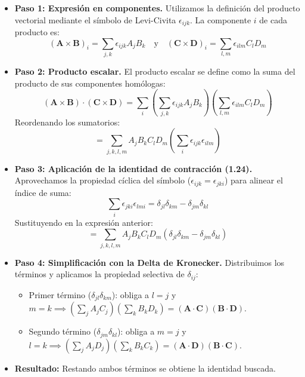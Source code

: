 \documentclass[a4paper]{article}
\begin{document}
\begin{itemize}
    \item \textbf{Paso 1: Expresión en componentes.}
    Utilizamos la definición del producto vectorial mediante el símbolo de Levi-Civita $\epsilon_{ijk}$. La componente $i$ de cada producto es:
    \begin{equation}
        (\mathbf{A} \times \mathbf{B})_i = \sum_{j,k} \epsilon_{ijk} A_j B_k \quad \text{y} \quad (\mathbf{C} \times \mathbf{D})_i = \sum_{l,m} \epsilon_{ilm} C_l D_m
    \end{equation}
    
    \item \textbf{Paso 2: Producto escalar.}
    El producto escalar se define como la suma del producto de sus componentes homólogas:
    \begin{equation}
        (\mathbf{A} \times \mathbf{B}) \cdot (\mathbf{C} \times \mathbf{D}) = \sum_i \left( \sum_{j,k} \epsilon_{ijk} A_j B_k \right) \left( \sum_{l,m} \epsilon_{ilm} C_l D_m \right)
    \end{equation}
    Reordenando los sumatorios:
    \begin{equation}
        = \sum_{j,k,l,m} A_j B_k C_l D_m \left( \sum_i \epsilon_{ijk} \epsilon_{ilm} \right)
    \end{equation}

    \item \textbf{Paso 3: Aplicación de la identidad de contracción (1.24).}
    Aprovechamos la propiedad cíclica del símbolo ($\epsilon_{ijk} = \epsilon_{jki}$) para alinear el índice de suma:
    \begin{equation}
        \sum_i \epsilon_{jki} \epsilon_{lmi} = \delta_{jl}\delta_{km} - \delta_{jm}\delta_{kl}
    \end{equation}
    Sustituyendo en la expresión anterior:
    \begin{equation}
        = \sum_{j,k,l,m} A_j B_k C_l D_m (\delta_{jl}\delta_{km} - \delta_{jm}\delta_{kl})
    \end{equation}

    \item \textbf{Paso 4: Simplificación con la Delta de Kronecker.}
    Distribuimos los términos y aplicamos la propiedad selectiva de $\delta_{ij}$:
    \begin{itemize}
        \item Primer término ($\delta_{jl}\delta_{km}$): obliga a $l=j$ y $m=k \implies (\sum_j A_j C_j) (\sum_k B_k D_k) = (\mathbf{A} \cdot \mathbf{C})(\mathbf{B} \cdot \mathbf{D})$.
        \item Segundo término ($\delta_{jm}\delta_{kl}$): obliga a $m=j$ y $l=k \implies (\sum_j A_j D_j) (\sum_k B_k C_k) = (\mathbf{A} \cdot \mathbf{D})(\mathbf{B} \cdot \mathbf{C})$.
    \end{itemize}

    \item \textbf{Resultado:} Restando ambos términos se obtiene la identidad buscada.
\end{itemize}
\end{document}
